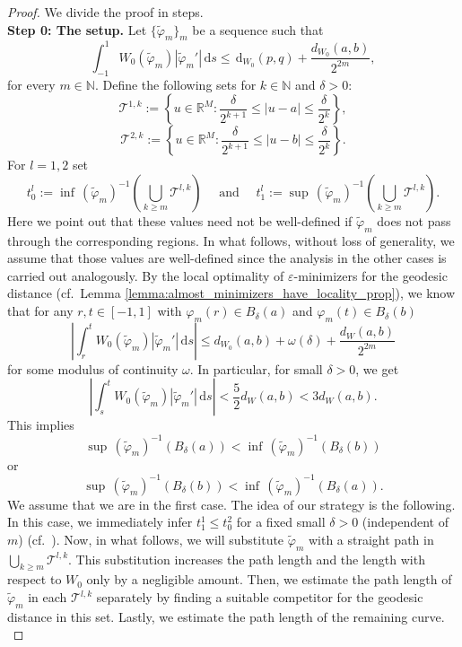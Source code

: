 \documentclass[a4paper, 11pt, reqno]{amsart}
\theoremstyle{plain}
\theoremstyle{definition}
\theoremstyle{remark}
\newcommand{\N}{\mathbb N}
\newcommand{\R}{\mathbb R}
\newcommand{\T}{\mathcal T}
\newcommand{\eps}{\varepsilon}
\newcommand{\dd}{\,\mathrm{d}}
\begin{document}
\begin{proof} We divide the proof in steps.\\[0.5em]
    \textbf{Step 0: The setup.}
    Let $\{ \tilde \varphi_m \}_m$ be a sequence such that
    \[
       \int_{-1}^1 W_0(\tilde \varphi_m)|\tilde \varphi_m'| \,\mathrm{d}s \leq \dd_{W_0}(p, q) + \frac{d_{W_0}(a,b)}{2^{2m}}, 
    \]
    for every $m \in \N$. Define the following sets for $k \in \N$ and $\delta > 0$:
    \[
        \T^{1,k} := \left\{ u \in \R^M: \frac{\delta}{2^{k+1}} \leq |u-a| \leq \frac{\delta}{2^{k}}\right\},
    \]
    \[
        \T^{2,k} := \left\{ u \in \R^M: \frac{\delta}{2^{k+1}} \leq |u-b| \leq \frac{\delta}{2^{k}}\right\}.
    \]
    For $l = 1,2$ set 
    \[
        t_0^l := \inf \, (\tilde \varphi_m)^{-1} \left(\bigcup_{k \geq m}\T^{l,k}\right) \quad \text{ and } \quad
        t_1^l := \sup \, (\tilde \varphi_m)^{-1} \left(\bigcup_{k \geq m}\T^{l,k}\right).
    \]
    Here we point out that these values need not be well-defined if $\tilde \varphi_m$ does not pass through the corresponding regions. In what follows, without loss of generality, we assume that those values are well-defined since the analysis in the other cases is carried out analogously. By the local optimality of $\eps$-minimizers for the geodesic distance (cf.\ Lemma \ref{lemma:almost_minimizers_have_locality_prop}), we know that for any $r, t \in [-1,1]$ with $\varphi_m(r) \in B_\delta(a)$ and $\varphi_m(t) \in B_\delta(b)$
    \[
        \left|\int_{r}^tW_0(\tilde \varphi_m)|\tilde \varphi_m'|\, \mathrm ds \right|  \leq d_{W_0}(a,b) + \omega(\delta) + \frac{d_W(a,b)}{2^{2m}}
    \]
    for some modulus of continuity $\omega$. In particular, for small $\delta > 0$, we get 
    \[
        \left|\int_{s}^tW_0(\tilde \varphi_m)|\tilde \varphi_m'|\, \mathrm ds \right| < \frac{5}{2}d_W(a,b) < 3d_W(a,b).
    \]
    This implies 
    \[
        \sup \, (\tilde \varphi_m)^{-1} (B_\delta(a)) < \inf \, (\tilde \varphi_m)^{-1} (B_\delta(b))
    \]
    or 
    \[
        \sup \, (\tilde \varphi_m)^{-1} (B_\delta(b)) < \inf \, (\tilde \varphi_m)^{-1} (B_\delta(a)).
    \]
    We assume that we are in the first case. The idea of our strategy is the following. In this case, we immediately infer $t_1^1 \leq t_0^2$ for a fixed small $\delta  > 0$ (independent of $m$) (cf.\ \cite[Lemma 2.8]{DeutschSolidSolid}). Now, in what follows, we will substitute $\tilde \varphi_m$ with a straight path in $\bigcup_{k \geq m}\T^{l,k}$. This substitution increases the path length and the length with respect to $W_0$ only by a negligible amount. Then, we estimate the path length of $\tilde \varphi_m$ in each $\T^{l,k}$ separately by finding a suitable competitor for the geodesic distance in this set. Lastly, we estimate the path length of the remaining curve. \\[-0.5em]
    

\end{proof}
\end{document}
